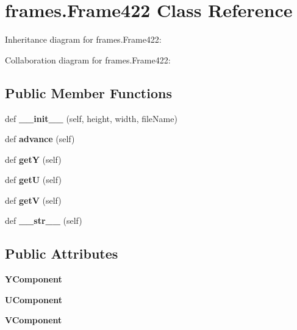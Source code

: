 \hypertarget{classframes_1_1Frame422}{}\section{frames.\+Frame422 Class Reference}
\label{classframes_1_1Frame422}


Inheritance diagram for frames.\+Frame422\+:


Collaboration diagram for frames.\+Frame422\+:
\subsection*{Public Member Functions}
\begin{DoxyCompactItemize}
\item 
\mbox{\label{classframes_1_1Frame422_acc31b7934a1f778bd95521571ee93017}} 
def {\bfseries \+\_\+\+\_\+init\+\_\+\+\_\+} (self, height, width, file\+Name)
\item 
\mbox{\label{classframes_1_1Frame422_a9c4e1a036abd4ddedde3d8171533b3cc}} 
def {\bfseries advance} (self)
\item 
\mbox{\label{classframes_1_1Frame422_a9bca6943cb9010c61194689e94c6bb3d}} 
def {\bfseries getY} (self)
\item 
\mbox{\label{classframes_1_1Frame422_aef51c1c5947fc2c798fdcea3747166a1}} 
def {\bfseries getU} (self)
\item 
\mbox{\label{classframes_1_1Frame422_a5378fd1a919862e80ccb42f81fc51acb}} 
def {\bfseries getV} (self)
\item 
\mbox{\label{classframes_1_1Frame422_a65f63b72a8db19dbfabd44d93daad5a3}} 
def {\bfseries \+\_\+\+\_\+str\+\_\+\+\_\+} (self)
\end{DoxyCompactItemize}
\subsection*{Public Attributes}
\begin{DoxyCompactItemize}
\item 
\mbox{\label{classframes_1_1Frame422_a8bb1578ddf4a0a13abc3c58543ff8cf8}} 
{\bfseries Y\+Component}
\item 
\mbox{\label{classframes_1_1Frame422_a962169a5bede229c95bc90c296b94889}} 
{\bfseries U\+Component}
\item 
\mbox{\label{classframes_1_1Frame422_a5cb6e0f2cfdb847f9090d964c8b84241}} 
{\bfseries V\+Component}
\end{DoxyCompactItemize}


